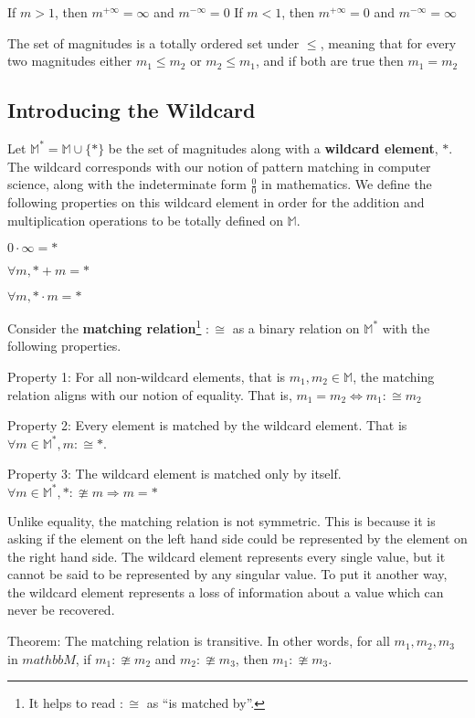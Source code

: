 \documentclass[twoside]{article}
\newcommand{\quotes}[1]{``#1''}
\begin{document}
If \(m > 1\), then \(m^{+\infty} = \infty\) and \(m^{-\infty} = 0\)
If \(m < 1\), then \(m^{+\infty} = 0\) and \(m^{-\infty} = \infty\)

The set of magnitudes is a totally ordered set under \(\leq\), meaning that for every two magnitudes either \(m_1 \leq m_2\) or \(m_2 \leq m_1\), and if both are true then \(m_1 = m_2\)

\subsection{Introducing the Wildcard}

Let \(\mathbb{M}^* = \mathbb{M} \cup \{\ast\}\) be the set of magnitudes along with a \textbf{wildcard element}, \(\ast\). The wildcard corresponds with our notion of pattern matching in computer science, along with the indeterminate form \(\frac{0}{0}\) in mathematics. We define the following properties on this wildcard element in order for the addition and multiplication operations to be totally defined on \(\mathbb{M}\).

\(0 \cdot \infty = \ast\)

\(\forall m,\ast + m = \ast\)

\(\forall m,\ast \cdot m = \ast\)

Consider the \textbf{matching relation}\footnote{It helps to read \(:\cong\) as \quotes{is matched by}.} \(:\cong\) as a binary relation on \(\mathbb{M}^*\) with the following properties.

Property 1: For all non-wildcard elements, that is \(m_1, m_2 \in \mathbb{M}\), the matching relation aligns with our notion of equality. That is, \(m_1 = m_2  \Leftrightarrow m_1 :\cong m_2 \)

Property 2: Every element is matched by the wildcard element. That is \(\forall m \in \mathbb{M}^*, m :\cong \ast\).

Property 3: The wildcard element is matched only by itself. \(\forall m \in \mathbb{M}^*, \ast :\ncong m \Rightarrow m = \ast\)

Unlike equality, the matching relation is not symmetric. This is because it is asking if the element on the left hand side could be represented by the element on the right hand side. The wildcard element represents every single value, but it cannot be said to be represented by any singular value. To put it another way, the wildcard element represents a loss of information about a value which can never be recovered.

Theorem: The matching relation is transitive. In other words, for all \(m_1, m_2, m_3\) in \(mathbb{M}\), if \(m_1 :\ncong m_2\) and \(m_2 :\ncong m_3\), then \(m_1 :\ncong m_3\).
\end{document}
